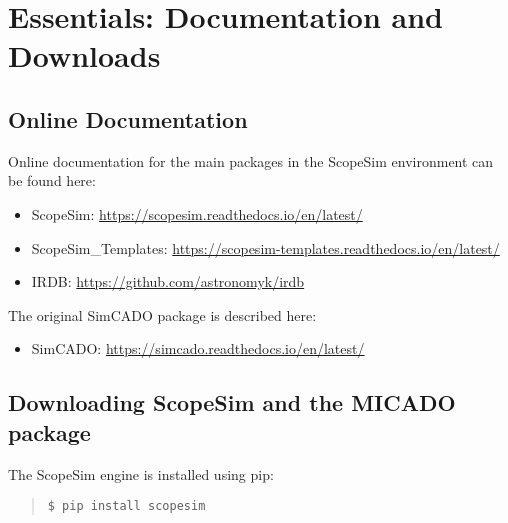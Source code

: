 

\section{Essentials: Documentation and Downloads%
  \label{essentials-documentation-and-downloads}%
}


\subsection{Online Documentation%
  \label{online-documentation}%
}

Online documentation for the main packages in the ScopeSim environment can be found here:

\begin{itemize}
\item ScopeSim: \url{https://scopesim.readthedocs.io/en/latest/}

\item ScopeSim\_Templates: \url{https://scopesim-templates.readthedocs.io/en/latest/}

\item IRDB: \url{https://github.com/astronomyk/irdb}
\end{itemize}

The original SimCADO package is described here:

\begin{itemize}
\item SimCADO: \url{https://simcado.readthedocs.io/en/latest/}
\end{itemize}



\subsection{Downloading ScopeSim and the MICADO package%
  \label{downloading-scopesim-and-the-micado-package}%
}

The ScopeSim engine is installed using pip:

\begin{quote}
\begin{alltt}
\begin{lstlisting}[frame=single]
$ pip install scopesim
\end{lstlisting}
\end{alltt}
\end{quote}

